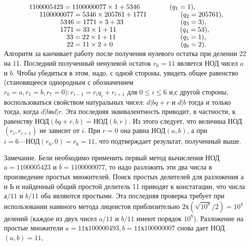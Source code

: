 $\hspace*{1.28cm} 1 100 005 423 = 1 100 000 077\times 1 + 5346 \hspace*{1.54cm}(q_1 = 1),$\\
$\hspace*{1.8cm} 1 100 000 077 = 5 346\times 205 761+ 1 771\hspace*{1.75cm} (q_2 = 205 761),$\\
$\hspace*{2.88cm} 5 346 = 1 771\times 3 +33 \hspace*{2.95cm}(q_3 = 3),$\\
$\hspace*{2.88cm} 1 771 = 33\times 1 +11 \hspace*{3.3cm}(q_4 = 53),$\\
$\hspace*{3.21cm} 33 = 22\times 1 + 11 \hspace*{3.34cm}(q_5 = 1),$\\
$\hspace*{3.21cm} 22 = 11\times 2 + 0 \hspace*{3.5cm}(q_6 = 2).$\\

    Алгоритм за канчивает работу после получения нулевого остатка при делении 22 на 11. Последний полученный ненулевой остаток $r_6 = 11$ является НОД чисел $a$ и $b$. Чтобы убедиться в этом, надо, с одной стороны, увидеть общее равенство (становящееся однородным с обозначением $r_0 = a, r_1 = b, r_7 = 0): r_{i-1} = r_iq_i + r_{i+1}$ для $0\leqslant i\leqslant 6$ и,с другой стороны, воспользоваться свойством натуральных чисел: $d| bq+r \text{ и } d | b$ тогда и только тогда, когда $d | b \text{и} d | r$. Эта последняя эквивалентность приводит, в частности, к равенству НОД$(bq + r,b) = \text{НОД}(b, r)$. Из этого следует, что величина НОД$(r_i,r_{i+1})$ не зависит от $i$. При $r = 0$ она равна НОД$(a, b)$, а при $i = 6 — \text{НОД}(r_6,0) = r_6 = 11$, что подтверждает результат, полученный выше.
    \begin{center}
    \parbox{12cm}{
    Замечание. Бели необходимо применить первый метод вычисления НОД $a = 1100 005 423$ и $b = 1100 000 077$, то надо разложить эти два числа в произведение простых множителей. Поиск простых делителей для разложения а и Ь и найденный общий простой делитель 11 приводят к констатации, что числа $а/11$ и $b/11$ оба являются простыми. Эта последняя проверка требует при использовании наивного метода лицеистов приблизительно $2 х (\sqrt{10^8}/2) = 10^4$ делений (каждое из двух чисел $a/11$ и $b/11$ имеют порядок $10^8$). Разложение на простые множители $a = 11 х 100 000 493, b = 11 х 100 000 007$ снова дает НОД$(a, b) = 11$,}
\end{center}

